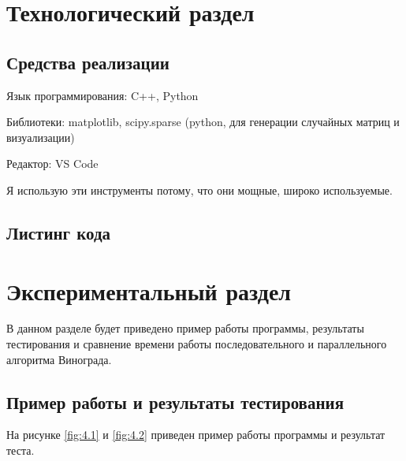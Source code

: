 \chapter{Технологический раздел}
\label{cha:impl}


\section{Средства реализации}

Язык программирования: C++, Python

Библиотеки: matplotlib, scipy.sparse
(python, для генерации случайных матриц и визуализации)

Редактор: VS Code

Я использую эти инструменты потому, что они мощные, широко используемые.



\section{Листинг кода}



\vspace{1cm}






\chapter{Экспериментальный раздел}
\label{cha:research}

В данном разделе будет приведено пример работы программы,
результаты тестирования и сравнение времени работы
последовательного и параллельного алгоритма Винограда.

\section{Пример работы и результаты тестирования}
На рисунке \ref{fig:4.1} и \ref{fig:4.2} приведен пример работы программы и результат теста.

